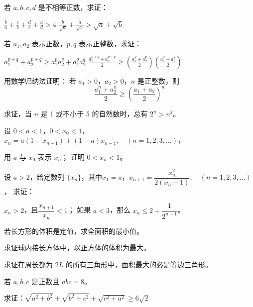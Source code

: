 \begin{Exercise}
\begin{question}
   \item  若 $a,b,c,d$ 是不相等正数，求证：
\begin{tasks}
    \task $\displaystyle \frac{b}{a}+\frac{c}{b}+\frac{d}{c}+\frac{a}{d}>4$
    \task $\displaystyle \frac{b}{\sqrt{a}}+\frac{a}{\sqrt{b}}>\sqrt{a}+\sqrt{b}$
\end{tasks}
   \item  若 $a_1,a_2$ 表示正数，$p,q$ 表示正整数，求证：
\begin{tasks}
    \task $\displaystyle a_1^{p+q}+a_2^{p+q}\geqslant a_1^pa_2^q+a_1^qa_2^q$
    \task $\displaystyle \frac{a_1^{p+q}+a_2^{p+q}}{2}\geqslant \left(\frac{a_1^p+a_2^p}{2}\right)\left(\frac{a_1^q+a_2^q}{2}\right)$
\end{tasks}

\item 用数学归纳法证明：
若 $a_1>0$，$a_2>0$，$n$ 是正整数，则
\[\frac{a_1^n+a_2^n}{2}\geqslant \left(\frac{a_1+a_2}{2}\right)^n\]
\item 求证，当 $n$ 是 1 或不小于 5 的自然数时，总有 $2^n>n^2$。
\item 设 $0<a<1$，$0<x_0<1$，$x_n=a(1-x_{n-1})+(1-a)x_{n-1},\quad (n=1,2,3,\ldots)$，
\begin{tasks}
  \task 用 $a$ 与 $x_0$ 表示 $x_n$；
  \task 证明 $0<x_n<1$。
\end{tasks}

\item 设 $a>2$，给定数列 $\{x_n\}$，其中$x_1=a$，$x_{n+1}=\dfrac{x^2_n}{2(x_n-1)},\quad (n=1,2,3,\ldots)$，
求证：
\begin{tasks}
  \task $x_n>2$，且$\dfrac{x_{n+1}}{x_n}<1$；
  \task 如果 $a<3$，那么 $x_n\leqslant 2+\dfrac{1}{2^{n-1}}$。
\end{tasks}

\item 若长方形的体积是定值，求全面积的最小值。
\item 求证球内接长方体中，以正方体的体积为最大。
\item 求证在周长都为 $2L$ 的所有三角形中，面积最大的必是等边三角形。
\item 若 $a,b,c$ 是正数且 $abc=8$。

求证：$\sqrt{a^2+b^2}+\sqrt{b^2+c^2}+\sqrt{c^2+a^2}\geqslant 6\sqrt{2}$


\end{question}
\end{Exercise}
